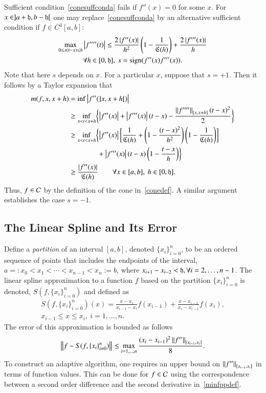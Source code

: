\documentclass[review]{elsarticle}
\newcommand{\datasites}{\{x_i\}_{i=0}^n}
\theoremstyle{definition}
\begin{document}
Sufficient condition~\eqref{conesuffconda} fails if $f''(x) = 0$ for some $x$.  For $x \in ]a + \fh, b-\fh[$ one may replace~\eqref{conesuffconda} by an alternative sufficient condition if  $f \in C^4[a,b]$:
\begin{multline} \label{conesuffcondb}
\max_{0 \le s(t-x) \le h }{\abs{f''''(t)}} \le \frac{2\abs{f''(x)}}{h^2} \left( 1 - \frac{1}{\fC(h)} \right) +  \frac{2\abs{f'''(x)}}{h}  \\ \forall  h \in [0,\fh], \ s = \sign(f''(x)f'''(x)).
\end{multline}
Note that here $s$ depends on $x$.  For a particular $x$, suppose that $s = +1$.  Then it follows by a Taylor expansion that
\begin{align*}
m(f,x,x+h) & = \inf \abs{f''(]x,x+h[)} \\
& \ge \inf_{x < t < x+h} \biggl\{ \abs{f''(x)} + \abs{f'''(x)}(t-x)  - \frac{\norm[{[x,x+h]}]{f''''}(t-x)^2}{2} \biggr\}\\
& \ge \inf_{x < t < x+h} \biggl\{ \abs{f''(x)} \biggl[ \frac{1}{\fC(h)} + \left(1 - \frac{(t-x)^2}{h^2}\right)\left(1 - \frac{1}{\fC(h)}\right) \biggr] \\
& \qquad \qquad + \abs{f'''(x)}(t-x)\left(1 -  \frac{t-x}{h}\right)  \biggr\}\\
& \ge  \frac{\abs{f''(x)}}{\fC(h)} \qquad \forall x \in [a,b],\ h \in [0,\fh].
\end{align*}
Thus, $f \in \cc$ by the definition of the cone in~\eqref{conedef}.  A similar argument establishes the case $s = -1$.

\subsection{The Linear Spline and Its Error} \label{subsec:spline}

Define a \emph{partition} of an interval $[a, b]$, denoted $\datasites$, to be
an ordered sequence of points that includes the endpoints of the interval,
$a=:x_0 < x_1 < \cdots < x_{n-1} < x_{n}:=b$, where $x_{i+1}-x_{i-2} <\fh, \forall i=2,\ldots, n-1$.  The linear spline
approximation to a function $f$ based on the partition $\datasites$ is denoted,
$S(f,\datasites)$ and defined as
\begin{multline} \label{splinedef}
S(f,\datasites)(x) =  \frac{x-x_i}{x_{i-1} - x_i} f(x_{i-1}) + \frac{x-x_{i-1}}{x_{i} - x_{i-1}}f(x_i), \\ x_{i-1} \le x \le x_i, \ i=1, \ldots, n.
\end{multline}
The error of this approximation is bounded as follows \cite{??}
\begin{equation} \label{appxerrbda}
\norm{f - S(f,\datasites)} \le \max_{i=1, \ldots, n} \frac{(x_i - x_{i-1})^2\norm[{[x_{i-1},x_i]}]{f''}}{8}.
\end{equation}
To construct an adaptive algorithm, one requires an upper bound on
$\norm[{[x_{i-1},x_i]}]{f''}$ in terms of function values. This can be done for
$f \in \cc$ using the correspondence between a second order difference and the
second derivative in~\eqref{minfppdef}.
\end{document}
